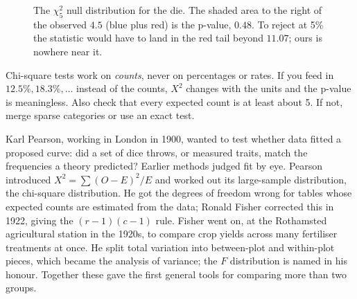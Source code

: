 \begin{figure}[H]
\centering
{}
\caption{The $\chi^2_5$ null distribution for the die. The shaded area to the
right of the observed $4.5$ (blue plus red) is the p-value, $0.48$. To reject at
5\% the statistic would have to land in the red tail beyond $11.07$; ours is
nowhere near it.}
\label{fig:cg-die-tail}
\end{figure}

\begin{trapbox}
Chi-square tests work on \emph{counts}, never on percentages or rates. If you
feed in $12.5\%, 18.3\%, \dots$ instead of the counts, $X^2$ changes with the
units and the p-value is meaningless. Also check that every expected count is
at least about 5. If not, merge sparse categories or use an exact test.
\end{trapbox}

\begin{historybox}
Karl Pearson, working in London in 1900, wanted to test whether data fitted a
proposed curve: did a set of dice throws, or measured traits, match the
frequencies a theory predicted? Earlier methods judged fit by eye. Pearson
introduced $X^2 = \sum (O-E)^2/E$ and worked out its large-sample distribution,
the chi-square distribution. He got the degrees of freedom wrong for tables
whose expected counts are estimated from the data; Ronald Fisher corrected this
in 1922, giving the $(r-1)(c-1)$ rule. Fisher went on, at the Rothamsted
agricultural station in the 1920s, to compare crop yields across many
fertiliser treatments at once. He split total variation into between-plot and
within-plot pieces, which became the analysis of variance; the $F$ distribution
is named in his honour. Together these gave the first general tools for
comparing more than two groups.
\end{historybox}

